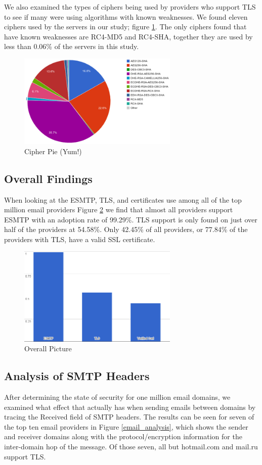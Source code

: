 We also examined the types of ciphers being used by providers who support TLS to 
see if many were using algorithms with known weaknesses. We found eleven ciphers 
used by the servers in our study; figure \ref{cipher_pie}. The only ciphers found that 
have known weaknesses are RC4-MD5 and RC4-SHA, together they are used by less 
than 0.06\% of the servers in this study.

\begin{figure}
    \includegraphics[width=3.0in]{images/pie_ciphers.png}
    \caption{Cipher Pie (Yum!)}
    \label{cipher_pie}
\end{figure}

\subsection{Overall Findings}
When looking at the ESMTP, TLS, and certificates use among all of the top 
million email providers Figure \ref{overall} we find that almost all 
providers support ESMTP with an adoption rate of 99.29\%. TLS support is only 
found on just over half of the providers at 54.58\%. Only 42.45\% of all 
providers, or 77.84\% of the providers with TLS, have a valid SSL 
certificate.

\begin{figure}
    \includegraphics[width=3.0in]{images/bar_overall.png}
    \caption{Overall Picture}
    \label{overall}
\end{figure}

\subsection{Analysis of SMTP Headers}
After determining the state of security for one million email domains, we 
examined what effect that actually has when sending emails between domains by 
tracing the Received field of SMTP headers.  The results can be seen for seven 
of the top ten email providers in Figure \ref{email_analysis}, which shows the sender and 
receiver domains along with the protocol/encryption information for the 
inter-domain hop of the message.  Of those seven, all but hotmail.com and 
mail.ru support TLS.

